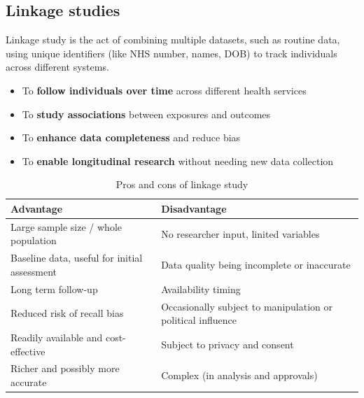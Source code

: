\documentclass{article}
\begin{document}
\subsection{Linkage studies}
Linkage study is the act of combining multiple datasets, such as routine data, using unique identifiers (like NHS number, names, DOB) to track individuals across different systems.
\begin{itemize}
    \item To \textbf{follow individuals over time} across different health services
    \item To \textbf{study associations} between exposures and outcomes
    \item To \textbf{enhance data completeness} and reduce bias
    \item To \textbf{enable longitudinal research} without needing new data collection
\end{itemize}

\begin{table}[H]
\centering
\begin{tabularx}{\textwidth}{|X|X|}
\hline
\textbf{Advantage} & \textbf{Disadvantage} \\ \hline
Large sample size / whole population & No researcher input, linited variables \\ \hline
Baseline data, useful for initial assessment & Data quality being incomplete or inaccurate \\ \hline
Long term follow-up & Availability timing \\ \hline
Reduced risk of recall bias & Occasionally subject to manipulation or political influence \\ \hline
Readily available and cost-effective & Subject to privacy and consent \\ \hline
Richer and possibly more accurate & Complex (in analysis and approvals) \\ \hline
\end{tabularx}
\caption{Pros and cons of linkage study}
\label{tab:pros-cons-linkage-study}
\end{table}

\pagebreak
\end{document}
